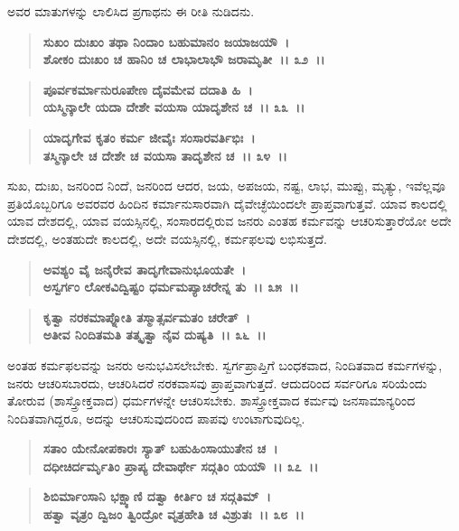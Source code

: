ಅವರ ಮಾತುಗಳನ್ನು ಲಾಲಿಸಿದ ಪ್ರಗಾಥನು ಈ ರೀತಿ ನುಡಿದನು.

\begin{verse}
\textbf{ಸುಖಂ ದುಃಖಂ ತಥಾ ನಿಂದಾಂ ಬಹುಮಾನಂ ಜಯಾಜಯೌ~।}\\\textbf{ಶೋಕಂ ದುಃಖಂ ಚ ಹಾನಿಂ ಚ ಲಾಭಾಲಾಭೌ ಜರಾಮೃತೀ~।। ೩೨~।।}
\end{verse}

\begin{verse}
\textbf{ಪೂರ್ವಕರ್ಮಾನುರೂಪೇಣ ದೈವಮೇವ ದದಾತಿ ಹಿ~।}\\\textbf{ಯಸ್ಮಿನ್ಕಾಲೇ ಯದಾ ದೇಶೇ ವಯಸಾ ಯಾದೃಶೇನ ಚ~।। ೩೩~।।}
\end{verse}

\begin{verse}
\textbf{ಯಾದೃಗೇವ ಕೃತಂ ಕರ್ಮ ಜೀವೈಃ ಸಂಸಾರವರ್ತಿಭಿಃ~।}\\\textbf{ತಸ್ಮಿನ್ಕಾಲೇ ಚ ದೇಶೇ ಚ ವಯಸಾ ತಾದೃಶೇನ ಚ~।। ೩೪~।।}
\end{verse}

ಸುಖ, ದುಃಖ, ಜನರಿಂದ ನಿಂದೆ, ಜನರಿಂದ ಆದರ, ಜಯ, ಅಪಜಯ, ನಷ್ಟ, ಲಾಭ, ಮುಪ್ಪು, ಮೃತ್ಯು, ಇವೆಲ್ಲವೂ ಪ್ರತಿಯೊಬ್ಬರಿಗೂ ಅವರವರ ಹಿಂದಿನ ಕರ್ಮಾನುಸಾರವಾಗಿ ದೈವೇಚ್ಛೆಯಿಂದಲೇ ಪ್ರಾಪ್ತವಾಗುತ್ತವೆ. ಯಾವ ಕಾಲದಲ್ಲಿ ಯಾವ ದೇಶದಲ್ಲಿ, ಯಾವ ವಯಸ್ಸಿನಲ್ಲಿ, ಸಂಸಾರದಲ್ಲಿರುವ ಜನರು ಎಂತಹ ಕರ್ಮವನ್ನು ಆಚರಿಸುತ್ತಾರೆಯೋ ಅದೇ ದೇಶದಲ್ಲಿ, ಅಂತಹುದೇ ಕಾಲದಲ್ಲಿ, ಅದೇ ವಯಸ್ಸಿನಲ್ಲಿ, ಕರ್ಮಫಲವು ಲಭಿಸುತ್ತದೆ.

\begin{verse}
\textbf{ಅವಶ್ಯಂ ವೈ ಜನೈರೇವ ತಾದೃಗೇವಾನುಭೂಯತೇ~।}\\\textbf{ಅಸ್ವರ್ಗಂ ಲೋಕವಿದ್ವಿಷ್ಟಂ ಧರ್ಮಮಪ್ಯಾಚರೇನ್ನ ತು~।। ೩೫~।। }
\end{verse}

\begin{verse}
\textbf{ಕೃತ್ವಾ ನರಕಮಾಪ್ನೋತಿ ತಸ್ಮಾತ್ಸರ್ವಮತಂ ಚರೇತ್~।}\\\textbf{ಅತೀವ ನಿಂದಿತಮತಿ ತತ್ಕೃತ್ವಾ ನೈವ ದುಷ್ಯತಿ~।। ೩೬~।।}
\end{verse}

ಅಂತಹ ಕರ್ಮಫಲವನ್ನು ಜನರು ಅನುಭವಿಸಲೇಬೇಕು. ಸ್ವರ್ಗಪ್ರಾಪ್ತಿಗೆ ಬಂಧಕವಾದ, ನಿಂದಿತವಾದ ಕರ್ಮಗಳನ್ನು, ಜನರು ಆಚರಿಸಬಾರದು, ಆಚರಿಸಿದರೆ ನರಕವಾಸವು ಪ್ರಾಪ್ತವಾಗುತ್ತದೆ. ಆದುದರಿಂದ ಸರ್ವರಿಗೂ ಸರಿಯೆಂದು ತೋರುವ (ಶಾಸ್ತ್ರೋಕ್ತವಾದ) ಧರ್ಮಗಳನ್ನೇ ಆಚರಿಸಬೇಕು. ಶಾಸ್ತ್ರೋಕ್ತವಾದ ಕರ್ಮವು ಜನಸಾಮಾನ್ಯರಿಂದ ನಿಂದಿತವಾಗಿದ್ದರೂ, ಅದನ್ನು ಆಚರಿಸುವುದರಿಂದ ಪಾಪವು ಉಂಟಾಗುವುದಿಲ್ಲ.

\begin{verse}
\textbf{ಸತಾಂ ಯೇನೋಪಕಾರಃ ಸ್ಯಾತ್ ಬಹುಹಿಂಸಾಯುತೇನ ಚ~।}\\\textbf{ದಧೀಚಿರ್ದರ್ಮೃತಿಂ ಪ್ರಾಪ್ಯ ದೇವಾರ್ಥೇ ಸದ್ಗತಿಂ ಯಯೌ~।। ೩೭~।। }
\end{verse}

\begin{verse}
\textbf{ಶಿಬಿರ್ಮಾಂಸಾನಿ ಭಕ್ಷ್ಯಾಣಿ ದತ್ವಾ ಕೀರ್ತಿಂ ಚ ಸದ್ಗತಿಮ್~।}\\\textbf{ಹತ್ವಾ ವೃತ್ರಂ ದ್ವಿಜಂ ತ್ವಿಂದ್ರೋ ವೃತ್ರಹೇತಿ ಚ ವಿಶ್ರುತಃ~।। ೩೮~।। }
\end{verse}

